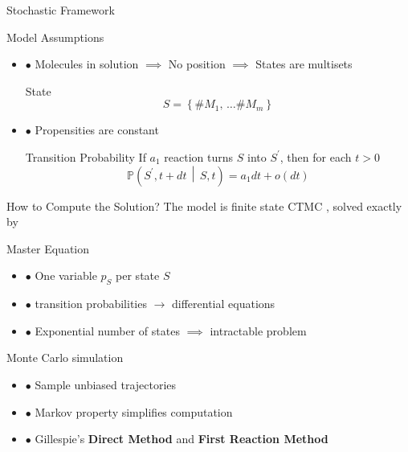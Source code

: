 \documentclass{beamer}
\begin{document}
\begin{frame}{Stochastic Framework}
  \begin{block}{Model Assumptions}
    \begin{itemize}
    \item $\bullet$ Molecules in solution $\implies$ No position $\implies$ States are multisets
      \begin{center}
        \begin{minipage}{.7 \textwidth}
          \begin{block}{State}
            $$ S = \left\{ \#M_1, \, \dots \#M_m \right\} $$
          \end{block}
        \end{minipage}
      \end{center}
      \vspace{1.pt}
    \item $\bullet$ Propensities are constant 
      \begin{center} 
       \begin{minipage}{.7 \textwidth}
          \begin{block}{Transition Probability}
            If $a_1$ reaction turns $S$ into $S^\prime$, then for each $t > 0$
            $$ \mathbb{P}\left(S^\prime, t + dt \,  \middle| \, S, t \right) = a_1dt + o(dt) $$
          \end{block}
        \end{minipage}
      \end{center}   
    \end{itemize}
  \end{block}
\end{frame}

\begin{frame}{How to Compute the Solution?}
  The model is finite state CTMC , solved exactly by
  \begin{block}{Master Equation}
    \begin{itemize}
    \item $\bullet$ One variable $p_S$ per state $S$
    \item $\bullet$ transition probabilities $\longrightarrow$ differential equations 
    \item $\bullet$ Exponential number of states $\implies$ intractable problem
    \end{itemize}
  \end{block}
  
  \begin{block}{Monte Carlo simulation}
    \begin{itemize}
    \item $\bullet$ Sample unbiased trajectories
    \item $\bullet$ Markov property simplifies computation
    \item $\bullet$ Gillespie's \textbf{Direct Method} and \textbf{First Reaction Method} 
    \end{itemize}
  \end{block}
\end{frame}
\end{document}
